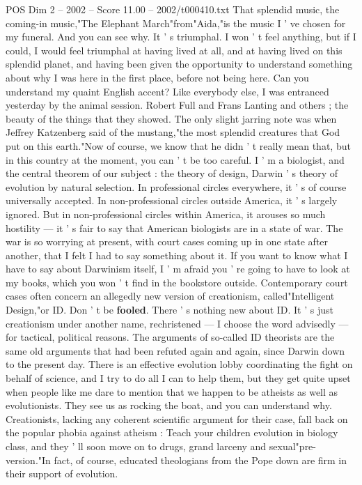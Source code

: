 \begin{textsample}{POS Dim 2 – 2002 – Score 11.00 – 2002/t000410.txt}  \label{ex:f2_pos_055}
That splendid music, the coming-in music,"The Elephant March"from"Aida,"is the music I ' ve chosen for my funeral.
And you can see why.
It ' s triumphal.
I won ' t feel anything, but if I could, I would feel triumphal at having lived at all, and at having lived on this splendid planet, and having been given the opportunity to understand something about why I was here in the first place, before not being here.
Can you understand my quaint English accent?
Like everybody else, I was entranced yesterday by the animal session.
Robert Full and Frans Lanting and others ; the beauty of the things that they showed.
The only slight jarring note was when Jeffrey Katzenberg said of the mustang,"the most splendid creatures that God put on this earth."Now of course, we know that he didn ' t really mean that, but in this country at the moment, you can ' t be too careful.
I ' m a biologist, and the central theorem of our subject : the theory of design, Darwin ' s theory of evolution by natural selection.
In professional circles everywhere, it ' s of course universally accepted.
In non-professional circles outside America, it ' s largely ignored.
But in non-professional circles within America, it arouses so much hostility — it ' s fair to say that American biologists are in a state of war.
The war is so worrying at present, with court cases coming up in one state after another, that I felt I had to say something about it.
If you want to know what I have to say about Darwinism itself, I ' m afraid you ' re going to have to look at my books, which you won ' t find in the bookstore outside.
Contemporary court cases often concern an allegedly new version of creationism, called"Intelligent Design,"or ID.
Don ' t be \textbf{fooled}.
There ' s nothing new about ID.
It ' s just creationism under another name, rechristened — I choose the word advisedly — for tactical, political reasons.
The arguments of so-called ID theorists are the same old arguments that had been refuted again and again, since Darwin down to the present day.
There is an effective evolution lobby coordinating the fight on behalf of science, and I try to do all I can to help them, but they get quite upset when people like me dare to mention that we happen to be atheists as well as evolutionists.
They see us as rocking the boat, and you can understand why.
Creationists, lacking any coherent scientific argument for their case, fall back on the popular phobia against atheism : Teach your children evolution in biology class, and they ' ll soon move on to drugs, grand larceny and sexual"pre-version."In fact, of course, educated theologians from the Pope down are firm in their support of evolution.

\end{textsample}
